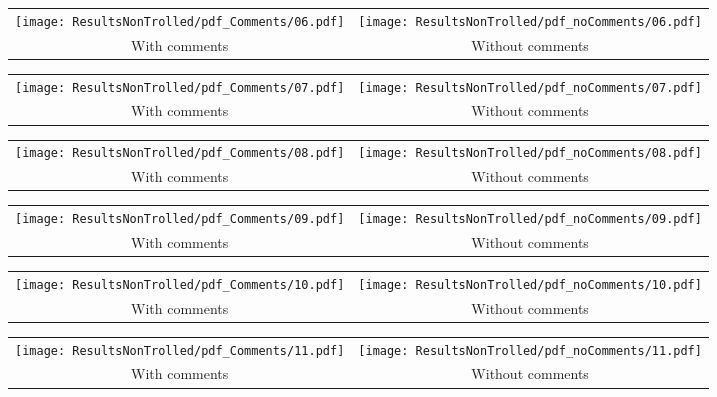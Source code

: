 \begin{tabular}{cc}
{  \texttt{[image: ResultsNonTrolled/pdf\_Comments/06.pdf]} } & 
{  \texttt{[image: ResultsNonTrolled/pdf\_noComments/06.pdf]}} \\
 With comments & Without comments \\
\end{tabular}

\begin{tabular}{cc}
{  \texttt{[image: ResultsNonTrolled/pdf\_Comments/07.pdf]} } & 
{  \texttt{[image: ResultsNonTrolled/pdf\_noComments/07.pdf]}} \\
 With comments & Without comments \\
\end{tabular}

\begin{tabular}{cc}
{  \texttt{[image: ResultsNonTrolled/pdf\_Comments/08.pdf]} } & 
{  \texttt{[image: ResultsNonTrolled/pdf\_noComments/08.pdf]}} \\
 With comments & Without comments \\
\end{tabular}

\begin{tabular}{cc}
{  \texttt{[image: ResultsNonTrolled/pdf\_Comments/09.pdf]} } & 
{  \texttt{[image: ResultsNonTrolled/pdf\_noComments/09.pdf]}} \\
 With comments & Without comments \\
\end{tabular}

\begin{tabular}{cc}
{  \texttt{[image: ResultsNonTrolled/pdf\_Comments/10.pdf]} } & 
{  \texttt{[image: ResultsNonTrolled/pdf\_noComments/10.pdf]}} \\
 With comments & Without comments \\
\end{tabular}

\begin{tabular}{cc}
{  \texttt{[image: ResultsNonTrolled/pdf\_Comments/11.pdf]} } & 
{  \texttt{[image: ResultsNonTrolled/pdf\_noComments/11.pdf]}} \\
 With comments & Without comments \\
\end{tabular}

